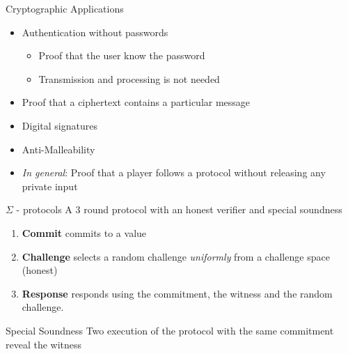 \documentclass[handout]{beamer}
\begin{document}
\begin{frame}{Cryptographic Applications}
\begin{itemize}
\item Authentication without passwords
\begin{itemize}
\item Proof that the user know the password
\item Transmission and processing is not needed
\end{itemize}
\pause
\item Proof that a ciphertext contains a particular message
\pause
\item Digital signatures
\item Anti-Malleability
\pause 
\item \emph{In general}: Proof that a player follows a protocol without releasing any private input
\end{itemize}
\end{frame}

\begin{frame}{$\Sigma$ - protocols}
A 3 round protocol with an honest verifier and special soundness
\begin{enumerate}
	\item \textbf{Commit} \prv commits to a value
	\item \textbf{Challenge} \ver selects a random challenge \emph{uniformly} from a challenge space (honest) 
	\item \textbf{Response} \prv responds using the commitment, the witness and the random challenge.
\end{enumerate}

\begin{block}{Special Soundness}
Two execution of the protocol with the same commitment reveal the witness
\end{block}
\end{frame}
\end{document}
